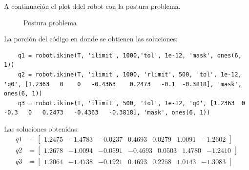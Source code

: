 \documentclass[a4paper,12pt]{article}
\begin{document}
A continuación el plot ddel robot con la postura problema.
\begin{figure}[H]
    \centering
    \begin{adjustbox}{scale = 0.85, max width=\columnwidth}
    \end{adjustbox}
    \caption{Postura problema}
\end{figure}

La porción del código en donde se obtienen las soluciones:
\begin{lstlisting}
    q1 = robot.ikine(T, 'ilimit', 1000,'tol', 1e-12, 'mask', ones(6, 1))
    q2 = robot.ikine(T, 'ilimit', 1000, 'rlimit', 500, 'tol', 1e-12, 'q0', [1.2363   0    0   -0.4363    0.2473   -0.1  -0.3818], 'mask', ones(6, 1))
    q3 = robot.ikine(T, 'ilimit', 500, 'tol', 1e-12, 'q0', [1.2363  0   -0.3   0   0.2473   -0.4363   -0.3818], 'mask', ones(6, 1))
\end{lstlisting}

Las soluciones obtenidas:
\begin{align*}
    q1 &= 
    \begin{bmatrix}
        1.2475 & -1.4783  & -0.0237  &  0.4693  &  0.0279  &  1.0091  & -1.2602
    \end{bmatrix}\\
    q2 &= 
    \begin{bmatrix}
        1.2678  &-1.0094 &  -0.0591  & -0.4693  &  0.0503  &  1.4780  & -1.2410
    \end{bmatrix}\\
    q3 &=
    \begin{bmatrix}
        1.2064  & -1.4738  & -0.1921 &   0.4693  &  0.2258   & 1.0143  & -1.3083
    \end{bmatrix}
\end{align*}
\end{document}

